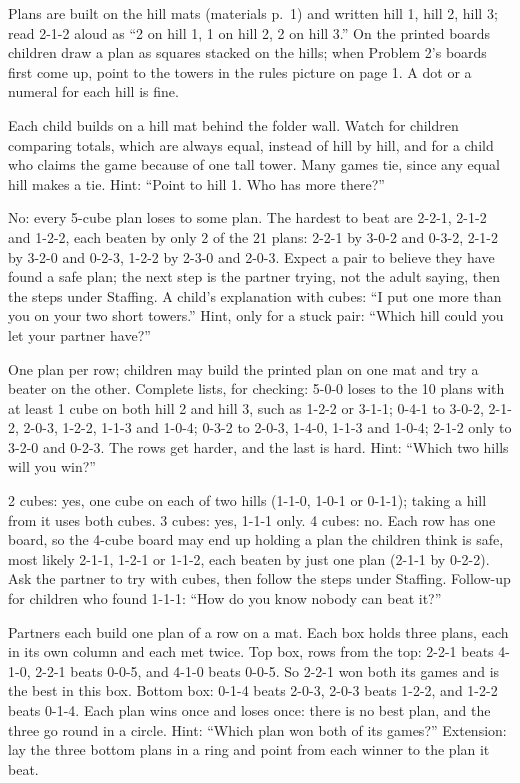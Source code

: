 Plans are built on the hill mats (materials p.~1) and written hill 1, hill 2, hill 3; read 2-1-2 aloud as ``2 on hill 1, 1 on hill 2, 2 on hill 3.'' On the printed boards children draw a plan as squares stacked on the hills; when Problem 2's boards first come up, point to the towers in the rules picture on page 1. A dot or a numeral for each hill is fine.

Each child builds on a hill mat behind the folder wall. Watch for children comparing totals, which are always equal, instead of hill by hill, and for a child who claims the game because of one tall tower. Many games tie, since any equal hill makes a tie. Hint: ``Point to hill 1. Who has more there?''

No: every 5-cube plan loses to some plan. The hardest to beat are 2-2-1, 2-1-2 and 1-2-2, each beaten by only 2 of the 21 plans: 2-2-1 by 3-0-2 and 0-3-2, 2-1-2 by 3-2-0 and 0-2-3, 1-2-2 by 2-3-0 and 2-0-3. Expect a pair to believe they have found a safe plan; the next step is the partner trying, not the adult saying, then the steps under Staffing. A child's explanation with cubes: ``I put one more than you on your two short towers.'' Hint, only for a stuck pair: ``Which hill could you let your partner have?''

One plan per row; children may build the printed plan on one mat and try a beater on the other. Complete lists, for checking: 5-0-0 loses to the 10 plans with at least 1 cube on both hill 2 and hill 3, such as 1-2-2 or 3-1-1; 0-4-1 to 3-0-2, 2-1-2, 2-0-3, 1-2-2, 1-1-3 and 1-0-4; 0-3-2 to 2-0-3, 1-4-0, 1-1-3 and 1-0-4; 2-1-2 only to 3-2-0 and 0-2-3. The rows get harder, and the last is hard. Hint: ``Which two hills will you win?''

2 cubes: yes, one cube on each of two hills (1-1-0, 1-0-1 or 0-1-1); taking a hill from it uses both cubes. 3 cubes: yes, 1-1-1 only. 4 cubes: no. Each row has one board, so the 4-cube board may end up holding a plan the children think is safe, most likely 2-1-1, 1-2-1 or 1-1-2, each beaten by just one plan (2-1-1 by 0-2-2). Ask the partner to try with cubes, then follow the steps under Staffing. Follow-up for children who found 1-1-1: ``How do you know nobody can beat it?''

Partners each build one plan of a row on a mat. Each box holds three plans, each in its own column and each met twice. Top box, rows from the top: 2-2-1 beats 4-1-0, 2-2-1 beats 0-0-5, and 4-1-0 beats 0-0-5. So 2-2-1 won both its games and is the best in this box. Bottom box: 0-1-4 beats 2-0-3, 2-0-3 beats 1-2-2, and 1-2-2 beats 0-1-4. Each plan wins once and loses once: there is no best plan, and the three go round in a circle. Hint: ``Which plan won both of its games?'' Extension: lay the three bottom plans in a ring and point from each winner to the plan it beat.

